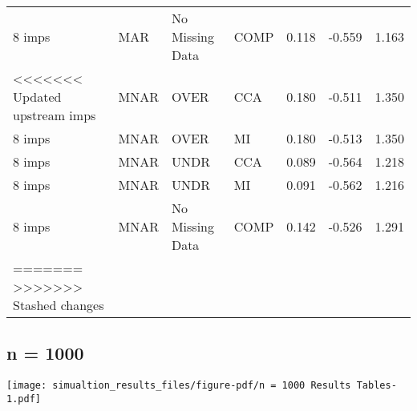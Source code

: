 \documentclass[
  letterpaper,
  DIV=11,
  numbers=noendperiod]{scrartcl}
\begin{document}
\begin{tabular}[t]{llllrrr}
8 imps & MAR & No Missing Data & COMP & 0.118 & -0.559 & 1.163\\
<<<<<<< Updated upstream
\addlinespace
8 imps & MNAR & OVER & CCA & 0.180 & -0.511 & 1.350\\
8 imps & MNAR & OVER & MI & 0.180 & -0.513 & 1.350\\
8 imps & MNAR & UNDR & CCA & 0.089 & -0.564 & 1.218\\
8 imps & MNAR & UNDR & MI & 0.091 & -0.562 & 1.216\\
8 imps & MNAR & No Missing Data & COMP & 0.142 & -0.526 & 1.291\\
=======
>>>>>>> Stashed changes
\bottomrule
\end{tabular}

\hypertarget{n-1000}{%
\subsection{n = 1000}\label{n-1000}}

\texttt{[image: simualtion\_results\_files/figure-pdf/n = 1000 Results Tables-1.pdf]}
\end{document}
